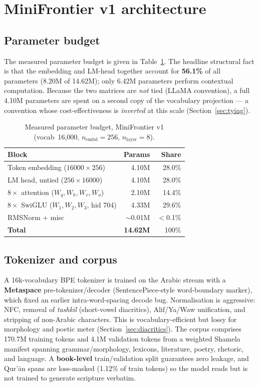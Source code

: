 \documentclass[10pt,twocolumn]{article}
\begin{document}
\section{MiniFrontier v1 architecture}

\subsection{Parameter budget}
The measured parameter budget is given in Table~\ref{tab:params}. The headline
structural fact is that the embedding and LM-head together account for
\textbf{56.1\%} of all parameters (8.20M of 14.62M); only 6.42M parameters
perform contextual computation. Because the two matrices are \emph{not} tied
(LLaMA convention), a full 4.10M parameters are spent on a second copy of the
vocabulary projection --- a convention whose cost-effectiveness is
\emph{inverted} at this scale (Section~\ref{sec:tying}).

\begin{table}[t]
\centering
\small
\caption{Measured parameter budget, MiniFrontier v1 (vocab~16{,}000, $n_{\text{embd}}{=}256$, $n_{\text{layer}}{=}8$).}
\label{tab:params}
\begin{tabular}{@{}lrr@{}}
\toprule
Block & Params & Share \\
\midrule
Token embedding ($16000{\times}256$)      & 4.10M & 28.0\% \\
LM head, untied ($256{\times}16000$)       & 4.10M & 28.0\% \\
$8\times$ attention ($W_q,W_k,W_v,W_o$)    & 2.10M & 14.4\% \\
$8\times$ SwiGLU ($W_1,W_2,W_3$, hid 704)  & 4.33M & 29.6\% \\
RMSNorm + misc                             & $\sim$0.01M & $<$0.1\% \\
\midrule
\textbf{Total}                             & \textbf{14.62M} & 100\% \\
\bottomrule
\end{tabular}
\end{table}

\subsection{Tokenizer and corpus}
A 16k-vocabulary BPE tokenizer is trained on the Arabic stream with a
\textbf{Metaspace} pre-tokenizer/decoder (SentencePiece-style word-boundary
marker), which fixed an earlier intra-word-spacing decode bug. Normalisation is
aggressive: NFC, removal of \emph{tashk\=il} (short-vowel diacritics), Alif/Ya/Waw
unification, and stripping of non-Arabic characters. This is vocabulary-efficient
but lossy for morphology and poetic meter (Section~\ref{sec:diacritics}). The
corpus comprises 170.7M training tokens and 4.1M validation tokens from a
weighted Shamela manifest spanning grammar/morphology, lexicons, literature,
poetry, rhetoric, and language. A \textbf{book-level} train/validation split
guarantees zero leakage, and Qur'\=an spans are loss-masked (1.12\% of train
tokens) so the model reads but is not trained to generate scripture verbatim.
\end{document}
